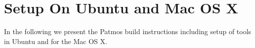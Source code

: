 \documentclass[a4paper,fontsize=10pt,twoside,DIV15,BCOR12mm,headinclude=true,footinclude=false,pagesize,bibtotoc]{scrbook}
\begin{document}
%
%
%
%
%
%
%
%

\section{Setup On Ubuntu and Mac OS X}

In the following we present the Patmos build instructions including setup of
tools in Ubuntu and for the Mac OS X.
\end{document}
